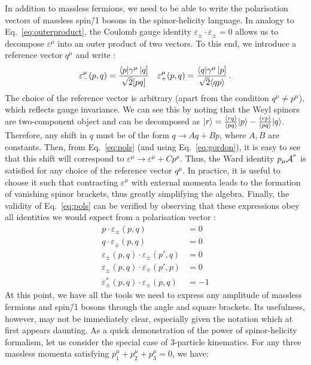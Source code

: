 \documentclass[main.tex]{subfiles}
\begin{document}
In addition to massless fermions, we need to be able to write the polarisation vectors of massless spin\=/1 bosons in the spinor-helicity language. In analogy to Eq.~\ref{eq:outerproduct}, the Coulomb gauge identity $\varepsilon_{\pm} \cdot \varepsilon_{\pm} = 0$  allows us to decompose $\varepsilon^\mu$ into an outer product of two vectors. To this end, we introduce a reference vector $q^\mu$ and write :
\begin{align} \label{eq:pols}
    \varepsilon^\mu_{-}(p, q) = \frac{\langle p|\gamma^\mu\left| q \right]}{\sqrt{2}[ pq ]} && \varepsilon^\mu_{+}(p, q) = \frac{\langle q|\gamma^\mu\left| p \right]}{\sqrt{2}\langle qp \rangle} \,.
\end{align}
The choice of the reference vector is arbitrary (apart from the condition $q^\mu \neq p^\mu$), which reflects gauge invariance. We can see this by noting that the Weyl spinors are two-component object and can be decomposed as $|r \rangle = \frac{\langle rq \rangle}{\langle pq \rangle}|p \rangle - \frac{\langle rp \rangle}{\langle pq \rangle}|q \rangle$. Therefore, any shift in $q$ must be of the form $q \rightarrow Aq + Bp$, where $A, B$ are constants. Then, from Eq.~\ref{eq:pols} (and using Eq.~\ref{eq:gordon}), it is easy to see that this shift will correspond to $\varepsilon^\mu \rightarrow \varepsilon^\mu + Cp^\mu$. Thus, the Ward identity $p_\mu \mathcal{A}_{}^{^\mu}$ is satisfied for any choice of the reference vector $q^\mu$. In practice, it is useful to choose it such that contracting $\varepsilon^\mu$ with external momenta leads to the formation of vanishing spinor brackets, thus greatly simplifying the algebra. Finally, the validity of Eq.~\ref{eq:pols} can be verified by observing that these expressions obey all identities we would expect from a polarisation vector :
\begin{subequations}
    \begin{align}
        p \cdot \varepsilon_\pm(p, q) &= 0 \\
        q \cdot \varepsilon_\pm(p, q) &= 0 \\
        \varepsilon_\pm (p, q) \cdot \varepsilon_\pm(p', q) &= 0 \\
        \varepsilon_\pm (p, q) \cdot \varepsilon_\mp(p', p) &= 0 \\
        \varepsilon_\pm^\ast (p, q) \cdot \varepsilon_\pm(p, q) &= -1
    \end{align}
\end{subequations}
At this point, we have all the tools we need to express any amplitude of massless fermions and spin\=/1 bosons through the angle and square brackets. Its usefulness, however, may not be immediately clear, especially given the notation which at first appears daunting. As a quick demonstration of the power of spinor-helicity formalism, let us consider the special case of 3-particle kinematics. For any three massless momenta satisfying $p_1^\mu + p_2^\mu + p_3^\mu = 0$, we have:
\end{document}
